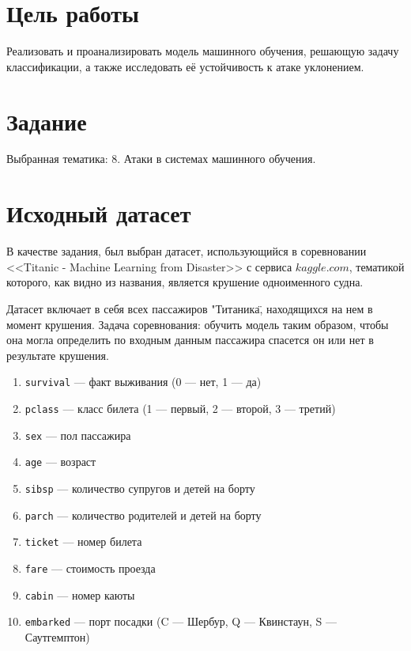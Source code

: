 \documentclass[14pt,a4paper]{extarticle}
\begin{document}
\section{Цель работы}

Реализовать и проанализировать модель машинного обучения, решающую задачу
классификации, а также исследовать её устойчивость к атаке уклонением.

\section{Задание}
\begin{sloppypar}
    Выбранная тематика: 8. Атаки в системах машинного обучения.\\
\end{sloppypar}

\newpage
\section{Исходный датасет}
    В качестве задания, был выбран датасет, использующийся в соревновании
    <<Titanic - Machine Learning from Disaster>> с сервиса $kaggle.com$, тематикой
    которого, как видно из названия, является крушение одноименного судна.

    Датасет включает в себя всех пассажиров "Титаника\", находящихся на нем в момент крушения.
    Задача соревнования: обучить модель таким образом, чтобы она могла определить по входным данным
    пассажира спасется он или нет в результате крушения.

\begin{enumerate}
    \setlength{\itemindent}{2em}
    \item \texttt{survival} — факт выживания (0 — нет, 1 — да)
    \item \texttt{pclass} — класс билета (1 — первый, 2 — второй, 3 — третий)
    \item \texttt{sex} — пол пассажира
    \item \texttt{age} — возраст
    \item \texttt{sibsp} — количество супругов и детей на борту
    \item \texttt{parch} — количество родителей и детей на борту
    \item \texttt{ticket} — номер билета
    \item \texttt{fare} — стоимость проезда
    \item \texttt{cabin} — номер каюты
    \item \texttt{embarked} — порт посадки
    (C — Шербур, Q — Квинстаун, S — Саутгемптон)
\end{enumerate}
\end{document}
